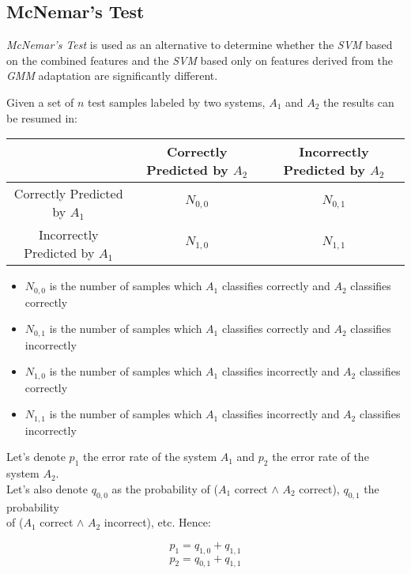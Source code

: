 \subsection{McNemar's Test} \label{subsection:mcnemar}

\textit{McNemar's Test} is used as an alternative to determine whether the \textit{SVM}
based on the combined features and the \textit{SVM} based only on features
derived from the \textit{GMM} adaptation are significantly different.

\cite{mcnemar} Given a set of $n$ test samples labeled by two systems, $A_{1}$ and $A_{2}$
the results can be resumed in:

\begin{center}
    \begin{tabular}{ | c | c | c | }
    \hline
    & Correctly Predicted by $A_{2}$ & Incorrectly Predicted by $A_{2}$ \\ \hline
    Correctly Predicted by $A_{1}$ & $N_{0,0}$ & $N_{0,1}$ \\ \hline
    Incorrectly Predicted by $A_{1}$ & $N_{1,0}$ & $N_{1,1}$ \\ \hline
    \end{tabular}
\end{center}

\begin{itemize}
\item{$N_{0, 0}$ is the number of samples which $A_{1}$ classifies correctly and $A_{2}$ classifies correctly}
\item{$N_{0, 1}$ is the number of samples which $A_{1}$ classifies correctly and $A_{2}$ classifies incorrectly}
\item{$N_{1, 0}$ is the number of samples which $A_{1}$ classifies incorrectly and $A_{2}$ classifies correctly}
\item{$N_{1, 1}$ is the number of samples which $A_{1}$ classifies incorrectly and $A_{2}$ classifies incorrectly}
\end{itemize}

Let's denote $p_{1}$ the error rate of the system $A_{1}$ and $p_{2}$ the error rate of the
system $A_{2}$. \\
Let's also denote $q_{0,0}$ as the probability of ($A_{1}$ correct $\land$ $A_{2}$ correct),
$q_{0,1}$ the probability \\ of ($A_{1}$ correct $\land$ $A_{2}$ incorrect), etc. Hence:

\begin{multicols}{2}
  \noindent
  \begin{equation}
    p_{1} = q_{1,0} + q_{1,1}
  \end{equation}
  \begin{equation}
    p_{2} = q_{0,1} + q_{1,1}
  \end{equation}
\end{multicols}

